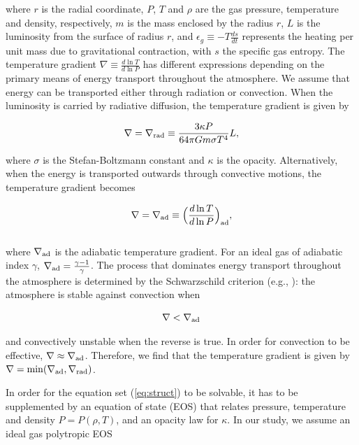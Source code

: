 \documentclass[apj]{emulateapj}
\newcommand{\delad}{\nabla_{\rm ad}}
\newcommand{\delrad}{\nabla_{\rm rad}}
\begin{document}
\noindent where $r$ is the radial coordinate, $P$, $T$ and $\rho$ are the gas pressure, temperature and density, respectively, $m$ is the mass enclosed by the radius $r$, $L$ is the luminosity from the surface of radius $r$, and $\epsilon_g \equiv -T \frac{ds}{dt}$ represents the heating per unit mass due to gravitational contraction, with $s$ the specific gas entropy. The temperature gradient $\nabla \equiv \frac{d \ln T}{d \ln P}$ has different expressions depending on the primary means of energy transport throughout the atmosphere. We assume that energy can be transported either through radiation or convection. When the luminosity is carried by radiative diffusion, the temperature gradient is given by

\begin{equation}
\label{eq:delrad}
\nabla = \delrad \equiv \frac{3 \kappa P}{64 \pi G m \sigma T^4} L,
\end{equation}

\noindent where $\sigma$ is the Stefan-Boltzmann constant and $\kappa$ is the opacity. Alternatively, when the energy is transported outwards through convective motions, the temperature gradient becomes


\begin{equation}
\label{eq:delad}
\nabla = \delad \equiv \Big(\frac{d \ln T}{d \ln P}\Big)_{\mathrm{ad}},
\end{equation}
\\

\noindent where $\delad$ is the adiabatic temperature gradient. For an ideal gas of adiabatic index $\gamma$, $\delad=\frac{\gamma-1}{\gamma}$. The process that dominates energy transport throughout the atmosphere is determined by the Schwarzschild criterion (e.g., \citealt{thompson06}): the atmosphere is stable against convection when

\begin{equation}
\label{eq:schwarz}
\nabla < \delad
\end{equation}

\noindent and convectively unstable when the reverse is true. In order for convection to be effective, $\nabla \approx \delad$. Therefore, we find that the temperature gradient is given by $\nabla=\mathrm{min}(\delad, \delrad)$. 

In order for the equation set (\ref{eq:struct}) to be solvable, it has to be supplemented by an equation of state (EOS) that relates pressure, temperature and density $P=P(\rho, T)$, and an opacity law for $\kappa$. In our study, we assume an ideal gas polytropic EOS 
\end{document}

